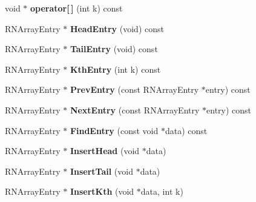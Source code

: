 \begin{DoxyCompactItemize}
\item 
void $\ast$ {\bfseries operator\mbox{[}$\,$\mbox{]}} (int k) const \hypertarget{class_r_n_v_array_a2e509eda03a959a0cc3a7ab38dcc5035}{}\label{class_r_n_v_array_a2e509eda03a959a0cc3a7ab38dcc5035}

\item 
R\+N\+Array\+Entry $\ast$ {\bfseries Head\+Entry} (void) const \hypertarget{class_r_n_v_array_aa99644beb872d1b056768ffd70b7a165}{}\label{class_r_n_v_array_aa99644beb872d1b056768ffd70b7a165}

\item 
R\+N\+Array\+Entry $\ast$ {\bfseries Tail\+Entry} (void) const \hypertarget{class_r_n_v_array_a1e2dc4efa890b4794adc471bb2913247}{}\label{class_r_n_v_array_a1e2dc4efa890b4794adc471bb2913247}

\item 
R\+N\+Array\+Entry $\ast$ {\bfseries Kth\+Entry} (int k) const \hypertarget{class_r_n_v_array_a0bddee388f351a28f550ec097dc84139}{}\label{class_r_n_v_array_a0bddee388f351a28f550ec097dc84139}

\item 
R\+N\+Array\+Entry $\ast$ {\bfseries Prev\+Entry} (const R\+N\+Array\+Entry $\ast$entry) const \hypertarget{class_r_n_v_array_add0fe1339f50d35a144a65e467c1daaa}{}\label{class_r_n_v_array_add0fe1339f50d35a144a65e467c1daaa}

\item 
R\+N\+Array\+Entry $\ast$ {\bfseries Next\+Entry} (const R\+N\+Array\+Entry $\ast$entry) const \hypertarget{class_r_n_v_array_a5855d1b9424726769b0781949df6e728}{}\label{class_r_n_v_array_a5855d1b9424726769b0781949df6e728}

\item 
R\+N\+Array\+Entry $\ast$ {\bfseries Find\+Entry} (const void $\ast$data) const \hypertarget{class_r_n_v_array_a82bb1012fe8b898d59cb2324f8c59302}{}\label{class_r_n_v_array_a82bb1012fe8b898d59cb2324f8c59302}

\item 
R\+N\+Array\+Entry $\ast$ {\bfseries Insert\+Head} (void $\ast$data)\hypertarget{class_r_n_v_array_a73f775bd36d269f8a6c18c95dd42a35a}{}\label{class_r_n_v_array_a73f775bd36d269f8a6c18c95dd42a35a}

\item 
R\+N\+Array\+Entry $\ast$ {\bfseries Insert\+Tail} (void $\ast$data)\hypertarget{class_r_n_v_array_aa27e4d608b9cbb6426d7061384295099}{}\label{class_r_n_v_array_aa27e4d608b9cbb6426d7061384295099}

\item 
R\+N\+Array\+Entry $\ast$ {\bfseries Insert\+Kth} (void $\ast$data, int k)\hypertarget{class_r_n_v_array_a4866b1b960a2967cdcb791b9ceaa8e58}{}\label{class_r_n_v_array_a4866b1b960a2967cdcb791b9ceaa8e58}


\end{DoxyCompactItemize}
